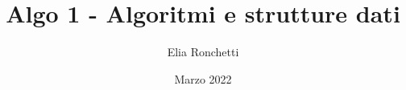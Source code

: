 \documentclass[12pt, a4paper, openany]{book}
\begin{document}
\title{Algo 1 - Algoritmi e strutture dati}
\author{Elia Ronchetti}
\date{Marzo 2022}

\maketitle
\tableofcontents


\end{document}
